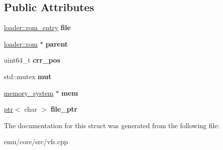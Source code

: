 \subsection*{Public Attributes}
\begin{DoxyCompactItemize}
\item 
\mbox{\label{structeka2l1_1_1rom__file_afdeb8e5fc418a89ee81d6414614922e7}} 
\mbox{\hyperlink{structeka2l1_1_1loader_1_1rom__entry}{loader\+::rom\+\_\+entry}} {\bfseries file}
\item 
\mbox{\label{structeka2l1_1_1rom__file_a28c63eab8ca3c5c887cfe621f0e0f972}} 
\mbox{\hyperlink{structeka2l1_1_1loader_1_1rom}{loader\+::rom}} $\ast$ {\bfseries parent}
\item 
\mbox{\label{structeka2l1_1_1rom__file_a5cab38150fa4a5ae9266d50c4ee3ed43}} 
uint64\+\_\+t {\bfseries crr\+\_\+pos}
\item 
\mbox{\label{structeka2l1_1_1rom__file_af4db53052ca2a5a4ea608769d4b9be94}} 
std\+::mutex {\bfseries mut}
\item 
\mbox{\label{structeka2l1_1_1rom__file_ae728dfa83cb92573cb260d79946b9850}} 
\mbox{\hyperlink{classeka2l1_1_1memory__system}{memory\+\_\+system}} $\ast$ {\bfseries mem}
\item 
\mbox{\label{structeka2l1_1_1rom__file_af3a128836203ac45b55972bfd6ab496d}} 
\mbox{\hyperlink{classeka2l1_1_1ptr}{ptr}}$<$ char $>$ {\bfseries file\+\_\+ptr}
\end{DoxyCompactItemize}


The documentation for this struct was generated from the following file\+:\begin{DoxyCompactItemize}
\item 
emu/core/src/vfs.\+cpp\end{DoxyCompactItemize}
